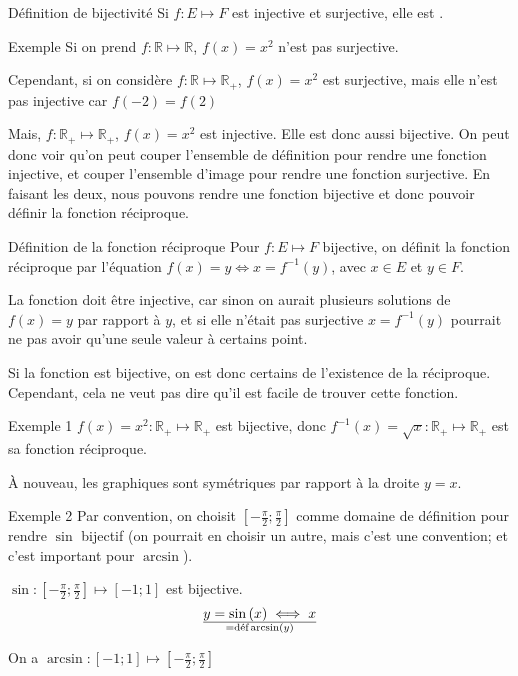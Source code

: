 \documentclass{article}
\begin{document}
\begin{parag}{Définition de bijectivité}
    Si $f: E \mapsto F$ est injective et surjective, elle est .
\end{parag}

\begin{parag}{Exemple}
    Si on prend $f: \mathbb{R} \mapsto \mathbb{R}$, $f\left(x\right) = x^2$ n'est pas surjective. 

    Cependant, si on considère $f: \mathbb{R} \mapsto \mathbb{R}_+$, $f\left(x\right) = x^2$ est surjective, mais elle n'est pas injective car $f\left(-2\right) = f\left(2\right)$

    Mais, $f: \mathbb{R}_+ \mapsto \mathbb{R}_+$, $f\left(x\right) = x^2$ est injective. Elle est donc aussi bijective. On peut donc voir qu'on peut couper l'ensemble de définition pour rendre une fonction injective, et couper l'ensemble d'image pour rendre une fonction surjective. En faisant les deux, nous pouvons rendre une fonction bijective et donc pouvoir définir la fonction réciproque.
\end{parag}

\begin{parag}{Définition de la fonction réciproque}
    Pour $f: E \mapsto F$ bijective, on définit la fonction réciproque par l'équation $f\left(x\right) = y \iff x = f^{-1}\left(y\right)$, avec $x\in E$ et $y \in F$. 

    La fonction doit être injective, car sinon on aurait plusieurs solutions de $f\left(x\right) = y$ par rapport à $y$, et si elle n'était pas surjective $x = f^{-1}\left(y\right)$ pourrait ne pas avoir qu'une seule valeur à certains point. 

    Si la fonction est bijective, on est donc certains de l'existence de la réciproque. Cependant, cela ne veut pas dire qu'il est facile de trouver cette fonction.
\end{parag}

\begin{parag}{Exemple 1}
    $f\left(x\right) = x^2: \mathbb{R}_+ \mapsto \mathbb{R}_+$ est bijective, donc $f^{-1}\left(x\right) = \sqrt{x}: \mathbb{R}_+ \mapsto \mathbb{R}_+$ est sa fonction réciproque.


    À nouveau, les graphiques sont symétriques par rapport à la droite $y = x$.
\end{parag}

\begin{parag}{Exemple 2}
    Par convention, on choisit $\left[-\frac{\pi}{2};\frac{\pi}{2}\right]$ comme domaine de définition pour rendre $\sin$ bijectif (on pourrait en choisir un autre, mais c'est une convention; et c'est important pour $\arcsin$).

    $\sin: \left[-\frac{\pi}{2}; \frac{\pi}{2}\right] \mapsto \left[-1;1\right] $ est bijective. 
    \[y = \sin\left(x\right) \iff x \over{=}{\text{déf}} \arcsin\left(y\right)\]
   
    On a $\arcsin: \left[-1; 1\right] \mapsto \left[-\frac{\pi}{2}; \frac{\pi}{2}\right]$
\end{parag}
\end{document}
